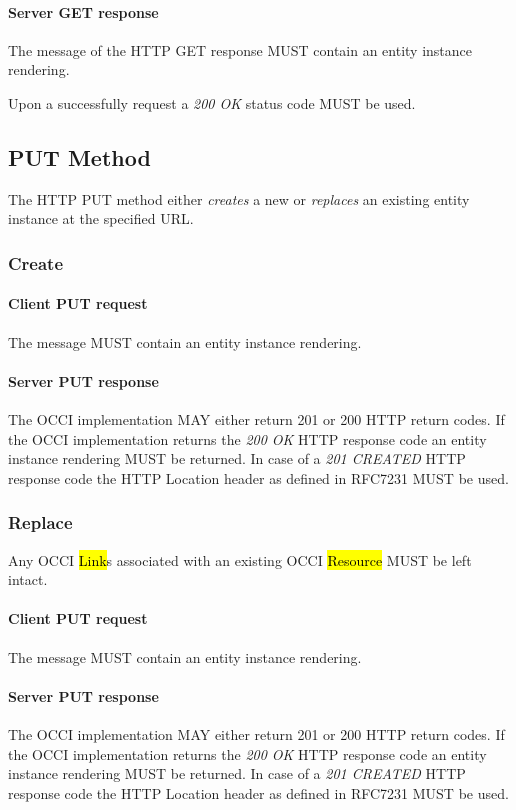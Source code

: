 \documentclass[10pt,a4paper]{article}
\begin{document}
\paragraph{Server GET response}
The message of the HTTP GET response MUST contain an entity instance rendering.

Upon a successfully request a \emph{200 OK} status code MUST be used.

\subsection{PUT Method}
The HTTP PUT method either {\em creates} a new or {\em replaces} an existing entity instance at the specified URL.

\subsubsection{Create}

\paragraph{Client PUT request}
The message MUST contain an entity instance rendering.

\paragraph{Server PUT response}
The OCCI implementation MAY either return 201 or 200 HTTP return codes. If the OCCI implementation
returns the \emph{200 OK} HTTP response code an entity instance rendering MUST be returned.
In case of a \emph{201 CREATED} HTTP response code the HTTP Location header as defined in RFC7231 \cite{rfc7231} MUST be used.

\subsubsection{Replace}
Any OCCI \hl{Link}s associated with an existing OCCI \hl{Resource} MUST be left intact.

\paragraph{Client PUT request}
The message MUST contain an entity instance rendering.

\paragraph{Server PUT response}
The OCCI implementation MAY either return 201 or 200 HTTP return codes.  If the OCCI implementation
returns the \emph{200 OK} HTTP response code an entity instance rendering MUST be returned.
In case of a \emph{201 CREATED} HTTP response code the HTTP Location header as defined in RFC7231 \cite{rfc7231} MUST be used.
\end{document}
